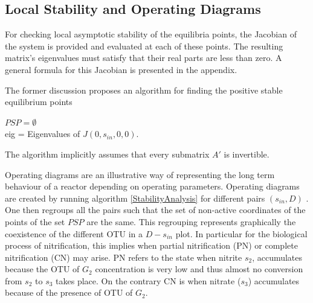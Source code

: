 \documentclass[3p,times]{elsarticle}
\newcommand{\N}{\mathbb{N}}
\newcommand{\R}{\mathbb{R}}
\begin{document}
\subsection{Local Stability and Operating Diagrams}
For checking local asymptotic stability of the equilibria points, the Jacobian of the system is provided and evaluated at each of these points. The resulting matrix's eigenvalues must satisfy that their real parts are less than zero. A general formula for this Jacobian is presented in the appendix.

The former discussion proposes an algorithm for finding the positive stable equilibrium points 

\begin{algorithm}[H]
	\KwData{$A \in M_{n\times n}(\R)$, $D, s_{in}, \bar{\mu}_i,K_i, k_i,  \in \R \, i\in [n], $, $n_1, n_2 \in \N$}
	$PSP = \emptyset$ \\
	eig = Eigenvalues of $J(0,s_{in},0,0)$. \\
	\label{StabilityAnalysis}
\end{algorithm}

The algorithm implicitly assumes that every submatrix $A'$ is invertible.

Operating diagrams are an illustrative way of representing the long term behaviour of a reactor depending on operating parameters. Operating diagrams are created by running algorithm \eqref{StabilityAnalysis} for different pairs $(s_{in},D)$ . One then regroups all the pairs such that the set of non-active coordinates of the points of the set $PSP$ are the same. This regrouping represents graphically the coexistence of the different OTU in a $D-s_{in}$ plot. In particular for the biological process of nitrification, this implies when partial nitrification (PN) or complete nitrification (CN) may arise. PN refers to the state when nitrite $s_2$, accumulates because the OTU of $G_2$ concentration is very low and thus almost no conversion from $s_2$  to $s_3$ takes place. On the contrary CN is when nitrate ($s_3$) accumulates because of the presence of OTU of $G_2$.
\end{document}
